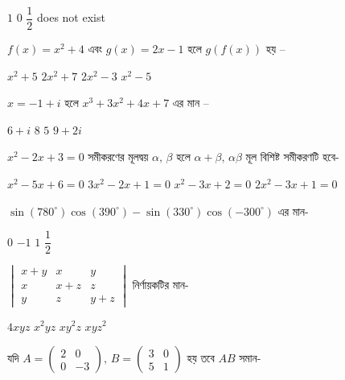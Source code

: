 \documentclass[addpoints]{exam}
\begin{document}
\begin{questions}
\begin{oneparchoices}
\choice $ 1 $
\choice $ 0 $
\choice $ \dfrac{1}{2}$
\choice  does not exist
\end{oneparchoices}

\question  $ f(x) = x^{2}+4 $ এবং $ g(x) = 2x-1 $ হলে $ g(f(x)) $ হয় – 

\begin{oneparchoices}
\choice $ x^{2}+5 $
\choice $ 2x^{2}+7 $
\choice $ 2x^{2}-3 $
\choice $ x^{2}-5 $
\end{oneparchoices}

\question $ x=-1+i $ হলে $ x^{3}+3x^{2}+4x+7 $ এর মান – 

\begin{oneparchoices}
\choice $ 6+i $
\choice $ 8 $
\choice $ 5 $
\choice $ 9+2i $
\end{oneparchoices}

 \question  $ x^{2}-2x+3=0 $ সমীকরণের  মূলদ্বয় $ \alpha,\, \beta $ হলে $ \alpha+\beta,\, \alpha\beta $ মূল বিশিষ্ট সমীকরণটি হবে- 

\begin{oneparchoices}
\choice $ x^{2}-5x+6=0  $
\choice $ 3x^{2}-2x+1=0  $
\choice $ x^{2}-3x+2=0  $
\choice $ 2x^{2}-3x+1=0  $
\end{oneparchoices}

\question $ \sin (780^{\circ})\cos (390^{\circ}) - \sin (330^{\circ})\cos (-300^{\circ}) $ এর মান- 


\begin{oneparchoices}
\choice $ 0 $
\choice $ -1 $
\choice $ 1 $
\choice $ \dfrac{1}{2} $
\end{oneparchoices}

\question $ \begin{vmatrix}
x+y & x & y\\
x & x+z & z\\
y & z & y+z 
\end{vmatrix} $ নির্ণায়কটির মান- 


\begin{oneparchoices}
\choice $ 4xyz $ 
\choice $ x^{2}yz $ 
\choice  $ xy^{2}z $
\choice $ xyz^{2} $
\end{oneparchoices}

\question  যদি $ A = \begin{pmatrix}
2 & 0\\
0 & -3
\end{pmatrix},\, B=\begin{pmatrix}
3 & 0\\
5 & 1
\end{pmatrix} $ হয় তবে $ AB $ সমান- 


\end{questions}
\end{document}
